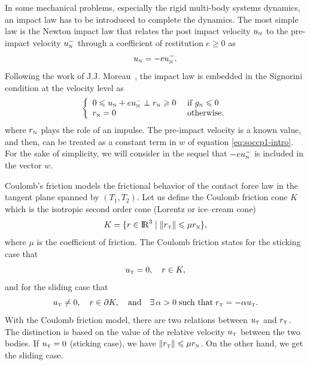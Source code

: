 {In some mechanical problems, especially the rigid multi-body systems dynamics, an impact law has to be introduced to complete the dynamics. The most simple law is the Newton impact law that relates the post impact velocity $u_{{\hbox{\tiny{N}}}}$ to the pre-impact velocity $u_{{\hbox{\tiny{N}}}}^-$ through a coefficient of restitution $e \geq 0$ as
\begin{equation}
  \label{eq:newton-2}
  u_{\n} = -e u_{\n}^-.
\end{equation}
Following the work of J.J. Moreau~\cite{Moreau1988}, the impact law is embedded in the Signorini condition at the velocity level as
\begin{equation}
  \label{eq:signo-velocity-impact}
  \left\{\begin{array}{ll}
  0 \leq u_{\n}  + e u_{\n}^- \perp r_\n \geq 0  &\text{ if } g_{\n} \leq 0 \\
  r_{\n} =0 &\text{ otherwise}.
\end{array}\right.
\end{equation}
where $r_{\hbox{\tiny{N}}}$ plays the role of an impulse.
The pre-impact velocity is a known value, and then, can be  treated as a constant term  in $w$ of equation \eqref{eq:soccp1-intro}. For the sake of simplicity, we will consider  in the sequel that $-e u^-_{{\hbox{\tiny{N}}}}$ is included in the vector $w$.


Coulomb's friction  models the frictional behavior of the contact force law in the tangent plane { spanned by $(T_1,T_2)$}. Let us define the Coulomb friction  cone $K$ which is the isotropic second order cone (Lorentz or ice--cream cone)
\begin{equation}
  \label{eq:CoulombCone}
  K = \{r \in \RR^3 \mid \|r_\t\| \leq \mu r_\n\},
\end{equation}
where $\mu$ is the coefficient of friction. The Coulomb friction  states for the sticking case that 
\begin{equation}
  \label{eq:Coulom-stick}
  u_{\t} =0,\quad r \in K,
\end{equation}
and for the sliding case that
\begin{equation}
  \label{eq:Coulom-slide}
  u_{\t}  \neq 0,\quad r \in \partial K, \quad\text{and}\quad\exists\, \alpha > 0\;\text{such that}\; r_\t = -\alpha u_\t.
\end{equation}
With the Coulomb friction model, there are two relations between $u_{\hbox{\tiny{T}}}$ and $r_{\hbox{\tiny{T}}}$. The distinction is based on the value of the relative velocity $u_{\hbox{\tiny{T}}}$ between the two bodies. If $u_{\hbox{\tiny{T}}}=0$ (sticking case), we have $\|r_{\hbox{\tiny{T}}}\| \leqslant \mu r_{\hbox{\tiny{N}}}$. On the other hand, we get the sliding case.

}
